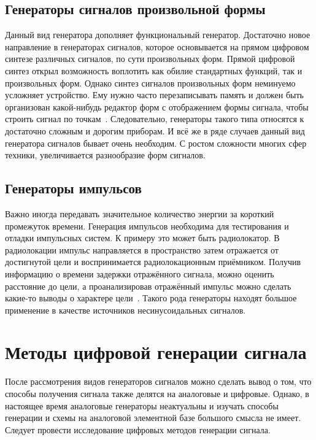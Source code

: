 \subsection{Генераторы сигналов произвольной формы}
	Данный вид генератора дополняет функциональный генератор. Достаточно новое направление в генераторах сигналов, которое основывается на прямом цифровом синтезе различных сигналов, по сути произвольных форм. Прямой цифровой синтез открыл возможность воплотить как обилие стандартных функций, так и произвольных форм. Однако синтез сигналов произвольных форм неминуемо усложняет устройство. Ему нужно часто перезаписывать память и должен быть организован какой-нибудь редактор форм с отображением формы сигнала, чтобы строить сигнал по точкам~\cite{dgs}. Следовательно, генераторы такого типа относятся к достаточно сложным и дорогим приборам.
	И всё же в ряде случаев данный вид генератора сигналов бывает очень необходим. С ростом сложности многих сфер техники, увеличивается разнообразие форм сигналов.

\subsection{Генераторы импульсов}
	Важно иногда передавать значительное количество энергии за короткий промежуток времени. Генерация импульсов необходима для тестирования и отладки импульсных систем. К примеру это может быть радиолокатор. В радиолокации импульс направляется в пространство затем отражается от достигнутой цели и воспринимается радиолокационным приёмником. Получив информацию о времени задержки отражённого сигнала, можно оценить расстояние до цели, а проанализировав отражённый импульс можно сделать какие-то выводы о характере цели~\cite{dgs}. Такого рода генераторы находят большое применение в качестве источников несинусоидальных сигналов. %

\section{Методы цифровой генерации сигнала}

	После рассмотрения видов генераторов сигналов можно сделать вывод о том, что способы получения сигнала также делятся на аналоговые и цифровые. Однако, в настоящее время аналоговые генераторы неактуальны и изучать способы генерации и схемы на аналоговой элементной базе большого смысла не имеет. Следует провести исследование цифровых методов генерации сигнала. 
